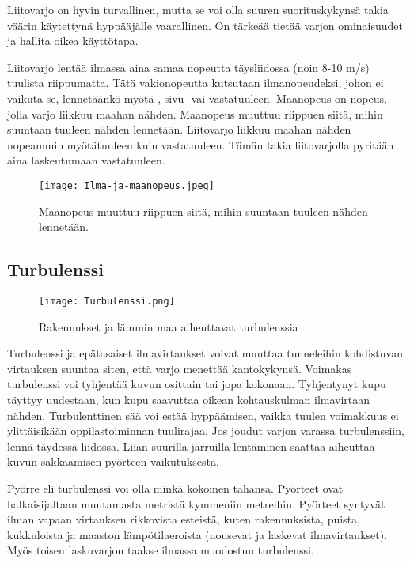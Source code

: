 \begin{multicols}{2}
Liitovarjo on hyvin turvallinen, mutta se voi olla suuren suorituskykynsä takia väärin käytettynä hyppääjälle vaarallinen. On tärkeää tietää varjon ominaisuudet ja hallita oikea käyttötapa. 


Liitovarjo lentää ilmassa aina samaa nopeutta täysliidossa (noin 8-10 m/s) tuulista riippumatta. Tätä vakionopeutta kutsutaan ilmanopeudeksi, johon ei vaikuta se, lennetäänkö myötä\mbox{-,} sivu- vai vastatuuleen. Maanopeus on nopeus, jolla varjo liikkuu maahan nähden. Maanopeus muuttuu riippuen siitä, mihin suuntaan tuuleen nähden lennetään. Liitovarjo liikkuu maahan nähden nopeammin myötätuuleen kuin vastatuuleen. Tämän takia liitovarjolla pyritään aina laskeutumaan vastatuuleen. 


\begin{figure*}[]\centering\texttt{[image: Ilma-ja-maanopeus.jpeg]}\caption{Maanopeus muuttuu riippuen siitä, mihin suuntaan tuuleen nähden lennetään.}\end{figure*} 

\subsection{ Turbulenssi }
\label{hyppytapahtuma-turbulenssi}


\begin{figure*}[]\centering\texttt{[image: Turbulenssi.png]}\caption{Rakennukset ja lämmin maa aiheuttavat turbulenssia}\end{figure*} 


Turbulenssi ja epätasaiset ilmavirtaukset voivat muuttaa tunneleihin kohdistuvan virtauksen suuntaa siten, että varjo menettää kantokykynsä. Voimakas turbulenssi voi tyhjentää kuvun osittain tai jopa kokonaan. Tyhjentynyt kupu täyttyy uudestaan, kun kupu saavuttaa oikean kohtauskulman ilmavirtaan nähden. Turbulenttinen sää voi estää hyppäämisen, vaikka tuulen voimakkuus ei ylittäisikään oppilastoiminnan tuulirajaa. Jos joudut varjon varassa turbulenssiin, lennä täydessä liidossa. Liian suurilla jarruilla lentäminen saattaa aiheuttaa kuvun sakkaamisen pyörteen vaikutuksesta. 


Pyörre eli turbulenssi voi olla minkä kokoinen tahansa. Pyörteet ovat halkaisijaltaan muutamasta metristä kymmeniin metreihin. Pyörteet syntyvät ilman vapaan virtauksen rikkovista esteistä, kuten rakennuksista, puista, kukkuloista ja maaston lämpötilaeroista (nousevat ja laskevat ilmavirtaukset). Myös toisen laskuvarjon taakse ilmassa muodostuu turbulenssi. 



\end{multicols}
